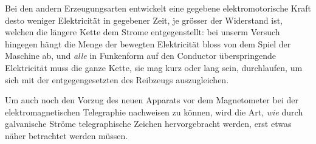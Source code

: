 \par\clearpage
{}
\noindent Bei den andern Erzeugungsarten entwickelt eine gegebene elektromotorische Kraft desto weniger Elektricität in gegebener Zeit, je grösser der Widerstand ist, welchen die längere Kette dem Strome entgegenstellt: bei unserm Versuch hingegen hängt die Menge der bewegten Elektricität bloss von dem Spiel der Maschine ab, und \textit{alle} in Funkenform auf den Conductor überspringende Elektricität muss die ganze Kette, sie mag kurz oder lang sein, durchlaufen, um sich mit der entgegengesetzten des Reibzeugs auszugleichen.

Um auch noch den Vorzug des neuen Apparats vor dem Magnetometer bei der elektromagnetischen Telegraphie nachweisen zu können, wird die Art, \textit{wie} durch galvanische Ströme telegraphische Zeichen hervorgebracht werden, erst etwas näher betrachtet werden müssen.

